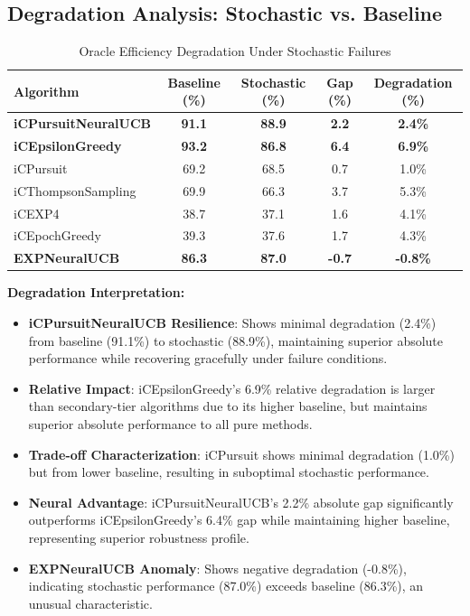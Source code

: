 \documentclass[12pt,a4paper]{article}
\newcommand{\primarytext}[1]{\textcolor{primaryblue}{\textbf{#1}}}
\newcommand{\secondarytext}[1]{\textcolor{secondaryblue}{\textbf{#1}}}
\newcommand{\success}[1]{\textcolor{accentgreen}{\textbf{#1}}}
\newcommand{\legacy}[1]{\textcolor{legacycolor}{\textbf{#1}}}
\newcommand{\neural}[1]{\textcolor{neuralcolor}{\textbf{#1}}}
\begin{document}
\subsection{Degradation Analysis: Stochastic vs. Baseline}

\begin{table}[H]
\centering
\caption{Oracle Efficiency Degradation Under Stochastic Failures}
\label{tab:degradation-analysis}
\begin{tabular}{@{}lcccc@{}}
\toprule
\textbf{Algorithm} & \textbf{Baseline (\%)} & \textbf{Stochastic (\%)} & \textbf{Gap (\%)} & \textbf{Degradation (\%)} \\
\midrule
\neural{iCPursuitNeuralUCB}   & \neural{91.1} & \neural{88.9} & \neural{2.2} & \neural{2.4\%} \\
\primarytext{iCEpsilonGreedy}   & \primarytext{93.2} & \primarytext{86.8} & \primarytext{6.4} & \primarytext{6.9\%} \\
iCPursuit                       & 69.2 & 68.5 & 0.7 & 1.0\% \\
iCThompsonSampling              & 69.9 & 66.3 & 3.7 & 5.3\% \\
iCEXP4                          & 38.7 & 37.1 & 1.6 & 4.1\% \\
iCEpochGreedy                   & 39.3 & 37.6 & 1.7 & 4.3\% \\
\legacy{EXPNeuralUCB}           & \legacy{86.3} & \legacy{87.0} & \legacy{-0.7} & \legacy{-0.8\%} \\
\bottomrule
\end{tabular}
\end{table}

\textbf{Degradation Interpretation:}
\begin{itemize}
\item \neural{iCPursuitNeuralUCB Resilience}: Shows minimal degradation (2.4\%) from baseline (91.1\%) to stochastic (88.9\%), maintaining superior absolute performance while recovering gracefully under failure conditions.
\item \primarytext{Relative Impact}: iCEpsilonGreedy's 6.9\% relative degradation is larger than secondary-tier algorithms due to its higher baseline, but maintains superior absolute performance to all pure methods.
\item \secondarytext{Trade-off Characterization}: iCPursuit shows minimal degradation (1.0\%) but from lower baseline, resulting in suboptimal stochastic performance.
\item \success{Neural Advantage}: iCPursuitNeuralUCB's 2.2\% absolute gap significantly outperforms iCEpsilonGreedy's 6.4\% gap while maintaining higher baseline, representing superior robustness profile.
\item \legacy{EXPNeuralUCB Anomaly}: Shows negative degradation (-0.8\%), indicating stochastic performance (87.0\%) exceeds baseline (86.3\%), an unusual characteristic.
\end{itemize}
\end{document}
